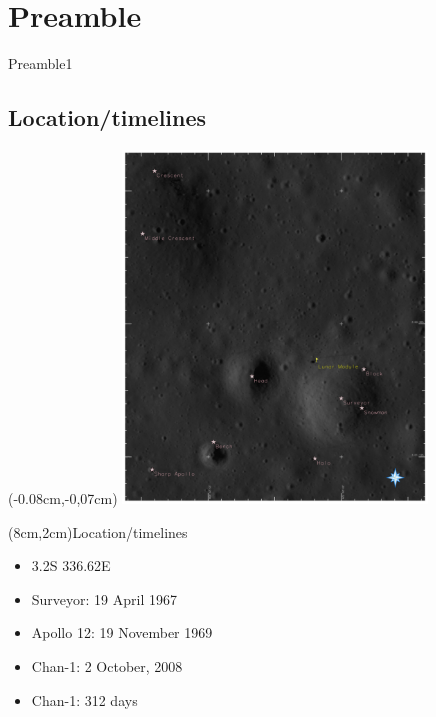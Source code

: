 \documentclass[unknownkeysallowed,xcolor=dvipsnames,beamer]{beamer} %
\begin{document}
\section{Preamble}
\begin{frame}[fragile]{Preamble1}
\subsection{Location/timelines}
\begin{multicols}{2}
\begin{textblock*}{5cm}(-0.08cm,-0,07cm) %
\includegraphics[width=8.08cm]{images/fig1}
\end{textblock*}
\begin{textblock*}{5cm}(8cm,2cm){Location/timelines}
\scriptsize
\begin{itemize}
\item 3.2S 336.62E
\item Surveyor: 19 April 1967
\item Apollo 12: 19 November 1969
\item Chan-1: 2 October, 2008
\item Chan-1: 312 days
\end{itemize}
\end{textblock*}
\end{multicols}
\end{frame}
\end{document}
